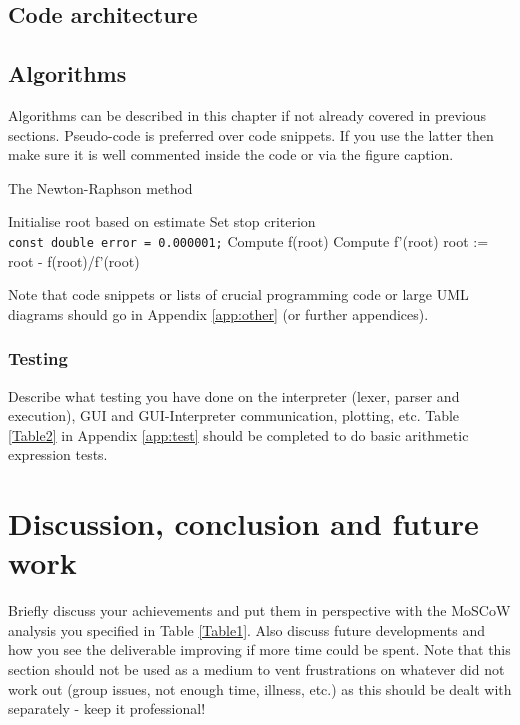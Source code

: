 \documentclass[a4paper, oneside, 11pt]{report}
\begin{document}
\section{Code architecture}
\label{code-arch}

\section{Algorithms}

Algorithms can be described in this chapter if not already covered in previous sections. Pseudo-code is preferred over code snippets. If you use the latter then make sure it is well commented inside the code or via the figure caption. 

\begin{algorithm}[th]
\caption{ The Newton-Raphson method }
\begin{algorithmic}[1]
\STATE Initialise root based on estimate
\STATE Set stop criterion
\\ \texttt{const double error = 0.000001;}
	\STATE Compute f(root)
	\STATE Compute f'(root)
	\STATE root := root - f(root)/f'(root)
\ENDWHILE
\end{algorithmic}
\end{algorithm}


Note that code snippets or lists of crucial programming code or large UML diagrams should go in Appendix \ref{app:other} (or further appendices).

\subsection{Testing}

Describe what testing you have done on the interpreter (lexer, parser and execution), GUI and GUI-Interpreter communication, plotting, etc. Table \ref{Table2} in Appendix \ref{app:test} should be completed to do basic arithmetic expression tests.


\chapter{Discussion, conclusion and future work}

Briefly discuss  your achievements and put them in perspective with the MoSCoW analysis you specified in Table \ref{Table1}. Also discuss future developments and how you see the deliverable improving if more time could be spent. Note that this section should not be used as a medium to vent frustrations on whatever did not work out (group issues, not enough time, illness, etc.) as this should be dealt with separately - keep it professional!
\end{document}
